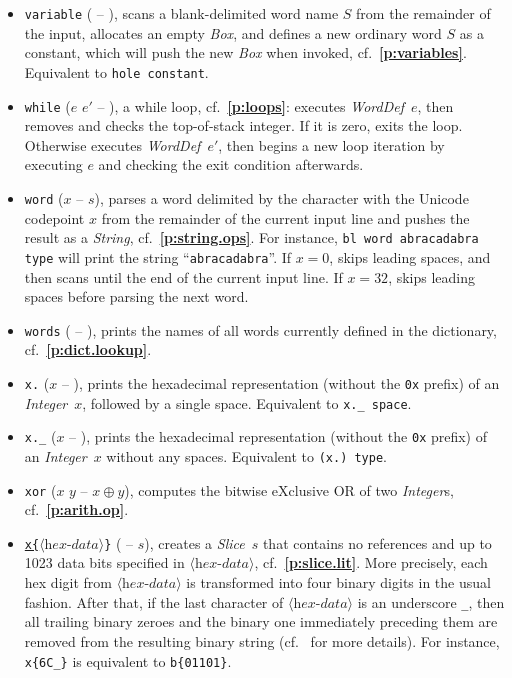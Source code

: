 \documentclass[12pt,oneside]{article}
\def\refpoint#1{{\rm\textbf{\ref{#1}}}}
\let\ptref=\refpoint
\begin{document}
\begin{itemize}
\item {\tt variable} ( -- ), scans a blank-delimited word name $S$ from the remainder of the input, allocates an empty {\em Box}, and defines a new ordinary word $S$ as a constant, which will push the new {\em Box\/} when invoked, cf.~\ptref{p:variables}. Equivalent to {\tt hole constant}.
\item {\tt while} ($e$ $e'$ -- ), a while loop, cf.~\ptref{p:loops}: executes {\em WordDef\/}~$e$, then removes and checks the top-of-stack integer. If it is zero, exits the loop. Otherwise executes {\em WordDef\/}~$e'$, then begins a new loop iteration by executing $e$ and checking the exit condition afterwards.
\item {\tt word} ($x$ -- $s$), parses a word delimited by the character with the Unicode codepoint $x$ from the remainder of the current input line and pushes the result as a {\em String}, cf.~\ptref{p:string.ops}. For instance, {\tt bl word abracadabra type} will print the string ``{\tt abracadabra}''. If $x=0$, skips leading spaces, and then scans until the end of the current input line. If $x=32$, skips leading spaces before parsing the next word.
\item {\tt words} ( -- ), prints the names of all words currently defined in the dictionary, cf.~\ptref{p:dict.lookup}.
\item {\tt x.} ($x$ -- ), prints the hexadecimal representation (without the {\tt 0x} prefix) of an {\em Integer\/}~$x$, followed by a single space. Equivalent to {\tt x.\_ space}.
\item {\tt x.\_} ($x$ -- ), prints the hexadecimal representation (without the {\tt 0x} prefix) of an {\em Integer\/}~$x$ without any spaces. Equivalent to {\tt (x.)~type}.
\item {\tt xor} ($x$ $y$ -- $x\oplus y$), computes the bitwise eXclusive OR of two {\em Integer\/}s, cf.~\ptref{p:arith.op}.
\item {\tt \underline{x\{}$\langle\textit{hex-data}\rangle$\}} ( -- $s$), creates a {\em Slice}~$s$ that contains no references and up to 1023 data bits specified in $\langle\textit{hex-data}\rangle$, cf.~\ptref{p:slice.lit}. More precisely, each hex digit from $\langle\textit{hex-data}\rangle$ is transformed into four binary digits in the usual fashion. After that, if the last character of $\langle\textit{hex-data}\rangle$ is an underscore {\tt \_}, then all trailing binary zeroes and the binary one immediately preceding them are removed from the resulting binary string (cf.~\cite[1.0]{TVM} for more details). For instance, {\tt x\{6C\_\}} is equivalent to {\tt b\{01101\}}.

\end{itemize}
\end{document}
